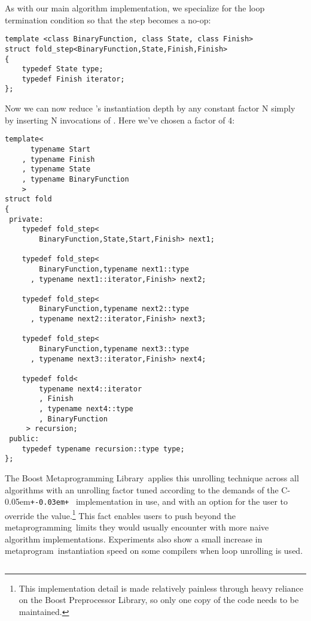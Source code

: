 \documentclass{netobjectdays}
\newcommand{\Cpp}{C\kern-0.05em\texttt{+\kern-0.03em+}%
}
\newcommand{\Mpl}{Boost Meta\-program\-ming Library}
\newcommand{\mping}{meta\-program\-ming}
\newcommand{\mpgm}{meta\-program}
\begin{document}
As with our main algorithm implementation, we specialize for the loop
termination condition so that the step becomes a no-op:

{\footnotesize
\begin{verbatim}
template <class BinaryFunction, class State, class Finish>
struct fold_step<BinaryFunction,State,Finish,Finish>
{
    typedef State type;
    typedef Finish iterator;
};
\end{verbatim}
}

Now we can now reduce 's instantiation depth by any
constant factor N simply by inserting N invocations of
. Here we've chosen a factor of 4:

{\footnotesize
\begin{verbatim}
template<
      typename Start
    , typename Finish
    , typename State
    , typename BinaryFunction
    >
struct fold
{
 private:
    typedef fold_step<
        BinaryFunction,State,Start,Finish> next1;
    
    typedef fold_step<
        BinaryFunction,typename next1::type
      , typename next1::iterator,Finish> next2;
    
    typedef fold_step<
        BinaryFunction,typename next2::type
      , typename next2::iterator,Finish> next3;
    
    typedef fold_step<
        BinaryFunction,typename next3::type
      , typename next3::iterator,Finish> next4;
    
    typedef fold<
        typename next4::iterator
        , Finish
        , typename next4::type
        , BinaryFunction
     > recursion;
 public:
    typedef typename recursion::type type;
};
\end{verbatim}
}

The \Mpl\ applies this unrolling technique across all algorithms with
an unrolling factor tuned according to the demands of the \Cpp\
implementation in use, and with an option for the user to override the
value.\footnote{This implementation detail is made relatively painless
through heavy reliance on the Boost Preprocessor Library, so only one
copy of the code needs to be maintained.} This fact enables users to
push beyond the \mping\ limits they would usually encounter with more
naive algorithm implementations. Experiments also show a small
increase in \mpgm\ instantiation speed on some compilers when loop
unrolling is used.

{\footnotesize
\begin{verbatim}
\end{verbatim}
}
\end{document}

